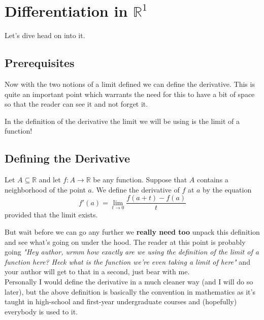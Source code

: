 
	\chapter{Differentiation in $\mathbb{R}^1$}
	Let's dive head on into it.
	\section{Prerequisites}
	
	
	Now with the two notions of a limit defined we can define the derivative. This is quite an important point which warrants the need for this to have a bit of space so that the reader can see it and not forget it.
	\medskip
	\begin{point}
		In the definition of the derivative the limit we will be using is the limit of a function!
	\end{point}
	
	
	
	\section{Defining the Derivative}
	
	
	\begin{definition}
		Let $A \subseteq \mathbb{R}$ and let $f : A \to \mathbb{R}$ be any function. Suppose that $A$ contains a neighborhood of the point $a$. We define the derivative of $f$ at $a$ by the equation $$f'(a) = \lim_{t \to 0} \frac{f(a+t) - f(a)}{t}$$ provided that the limit exists.
	\end{definition}
	
	But wait before we can go any further we \textbf{really need too} unpack this definition and see what's going on under the hood. The reader at this point is probably going \textit{"Hey author, urmm how exactly are we using the definition of the limit of a function here? Heck what is the function we're even taking a limit of here"} and your author will get to that in a second, just bear with me. \\
		
	Personally I would define the derivative in a much cleaner way (and I will do so later), but the above definition is basically the convention in mathematics as it's taught in high-school and first-year undergraduate courses and (hopefully) everybody is used to it. \\
		
